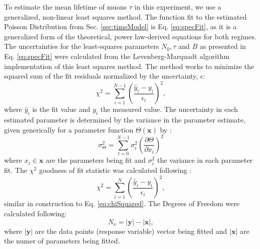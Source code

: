\documentclass[
    aps, 
    twocolumn, 
    secnumarabic, 
    balancelastpage, 
    amsmath, 
    amssymb, 
    nofootinbib, 
    floatfix
]{revtex4-2}
\begin{document}
To estimate the mean lifetime of muons $\tau$ in this experiment, we use a generalized, non-linear least squares method. The function fit to the estimated Poisson Distribution from Sec. \ref{sec:timeModel} is Eq. \eqref{eq:specFit}, as it is a generalized form of the theoretical, power law-derived equations for both regimes. The uncertainties for the least-squares parameters $N_0, \tau$ and $B$ as presented in Eq. \eqref{eq:specFit} were calculated from the Levenberg-Marquadt algorithm implementation of this least squares method. The method works to minimize the squared sum of the fit residuals normalized by the uncertainty, $\epsilon$:
\begin{equation}
    \chi^2 = \sum_{i=1}^{N-1} \left(\frac{\widehat{y}_i - y_i}{\epsilon_i}\right)^2,
    \label{eq:chiSquared}
\end{equation}
where $\widehat{y}_i$ is the fit value and $y_i$ the measured value. The uncertainty in each estimated parameter is determined by the variance in the parameter estimate, given generically for a parameter function $\Theta(\bm{x})$ by \cite{manual2021_lsm}:
\begin{equation}
    \sigma^2_\Theta = \sum_{t=0}^{N-1} \sigma^2_i\left(\dfrac{\partial \Theta}{\partial x_i}\right)^2
\end{equation}
where $x_i \in \bm{x}$ are the parameters being fit and $\sigma^2_i$ the variance in each parameter fit.
The $\chi^2$ goodness of fit statistic was calculated following :
\begin{equation}
    \chi^2 = \sum_{i=1}^N \left(\frac{\widehat{y}_i - y_i}{\epsilon_i}\right)^2,
\end{equation}
similar in construction to Eq. \eqref{eq:chiSquared}.
The Degrees of Freedom were calculated following:
\begin{equation}
    N_\nu = \lvert \bm{y} \rvert - \lvert \bm{x} \rvert,
\end{equation}
where $\lvert \bm{y} \rvert$ are the data points (response variable) vector being fitted and $\lvert \bm{x} \rvert$ are the numer of parameters being fitted.
\end{document}
